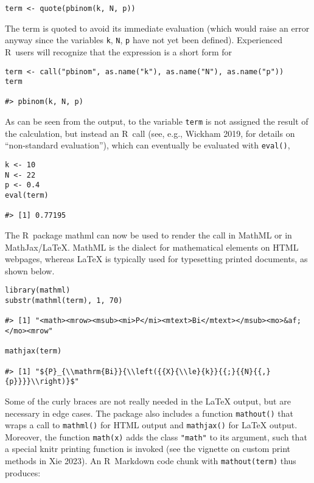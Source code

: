 \begin{verbatim}
term <- quote(pbinom(k, N, p))
\end{verbatim}

The term is quoted to avoid its immediate evaluation (which would raise
an error anyway since the variables \texttt{k}, \texttt{N}, \texttt{p} have not yet been
defined). Experienced R~users will recognize that the expression is a
short form for

\begin{verbatim}
term <- call("pbinom", as.name("k"), as.name("N"), as.name("p"))
term

#> pbinom(k, N, p)
\end{verbatim}

As can be seen from the output, to the variable \texttt{term} is not assigned
the result of the calculation, but instead an R~call (see, e.g., Wickham
2019, for details on ``non-standard evaluation''), which can eventually be
evaluated with \texttt{eval()},

\begin{verbatim}
k <- 10
N <- 22
p <- 0.4
eval(term)

#> [1] 0.77195
\end{verbatim}

The R~package mathml can now be used to render the call in MathML or in
MathJax/LaTeX. MathML is the dialect for mathematical elements on HTML
webpages, whereas LaTeX is typically used for typesetting printed
documents, as shown below.

\begin{verbatim}
library(mathml)
substr(mathml(term), 1, 70)

#> [1] "<math><mrow><msub><mi>P</mi><mtext>Bi</mtext></msub><mo>&af;</mo><mrow"

mathjax(term)

#> [1] "${P}_{\\mathrm{Bi}}{\\left({{X}{\\le}{k}}{{;}{{N}{{,}{p}}}}\\right)}$"
\end{verbatim}

Some of the curly braces are not really needed in the LaTeX output, but
are necessary in edge cases. The package also includes a function
\texttt{mathout()} that wraps a call to \texttt{mathml()} for HTML output and
\texttt{mathjax()} for LaTeX output. Moreover, the function \texttt{math(x)} adds the
class \texttt{"math"} to its argument, such that a special knitr printing
function is invoked (see the vignette on custom print methods in Xie
2023). An R~Markdown code chunk with \texttt{mathout(term)} thus produces:

